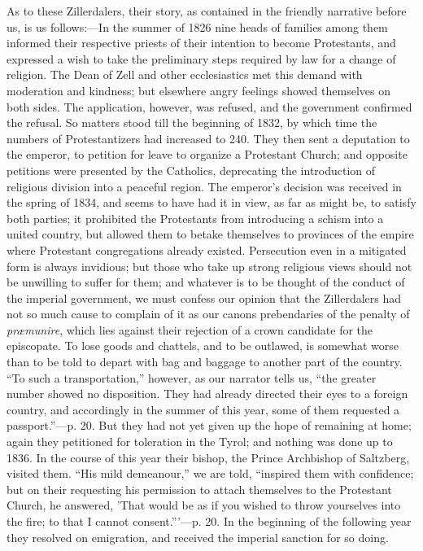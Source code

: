 As to these Zillerdalers, their story, as contained
in the friendly narrative before us, is us follows:—In the summer of
1826 nine heads of families among them informed their respective priests
of their intention to become Protestants, and expressed a wish to take
the preliminary steps required by law for a change of religion. The Dean
of Zell and other ecclesiastics met this demand with moderation and
kindness; but elsewhere angry feelings showed themselves on both sides.
The application, however, was refused, and the government confirmed the
refusal. So matters stood till the beginning of 1832, by which time the
numbers of Protestantizers had increased to 240. They then sent a
deputation to the emperor, to petition for leave to organize a
Protestant Church; and opposite petitions were presented by the
Catholics, deprecating the introduction of religious division into a
peaceful region. The emperor's decision was received in the spring
of 1834, and seems to have had it in view, as far as might be, to
satisfy both parties; it prohibited the Protestants from introducing a
schism into a united country, but allowed them to betake themselves to
provinces of the empire where Protestant congregations already existed.
Persecution even in a mitigated form is always invidious; but those who
take up strong religious views should not be unwilling to suffer for
them; and whatever is to be thought of the conduct of the imperial
government, we must confess our opinion that the Zillerdalers had not so
much cause to complain of it as our canons prebendaries of the penalty
of \emph{præmunire}, which lies against their rejection of a crown
candidate for the episcopate. To lose goods and chattels, and to be
outlawed, is somewhat worse than to be told to depart with bag and
baggage to another part of the country. ``To such a transportation,''
however, as our narrator tells us, ``the greater number showed no
disposition. They had already directed their eyes to a foreign country,
and accordingly in the summer of this year, some of them requested a
passport.''—p. 20. But they had not yet given up the hope of remaining
at home; again they petitioned for toleration in the Tyrol; and nothing
was done up to 1836. In the course of this year their bishop, the Prince
Archbishop of Saltzberg, visited them. ``His mild demeanour,'' we are
told, ``inspired them with confidence; but on their requesting his
permission to attach themselves to the Protestant Church, he answered, 'That
would be as if you wished to throw yourselves into the fire; to that I
cannot consent.'''—p. 20. In the beginning of the following year they
resolved on emigration, and received the imperial sanction for so doing.

